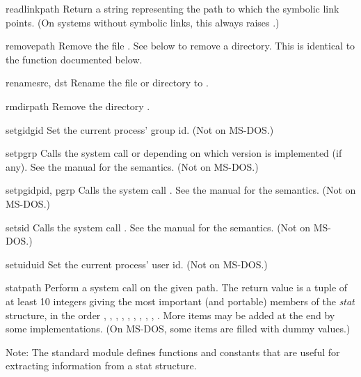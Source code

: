 \begin{funcdesc}{readlink}{path}
Return a string representing the path to which the symbolic link
points.  (On systems without symbolic links, this always raises
.)
\end{funcdesc}

\begin{funcdesc}{remove}{path}
Remove the file .  See  below to remove a
directory.  This is identical to the  function
documented below.
\end{funcdesc}

\begin{funcdesc}{rename}{src, dst}
Rename the file or directory  to .
\end{funcdesc}

\begin{funcdesc}{rmdir}{path}
Remove the directory .
\end{funcdesc}

\begin{funcdesc}{setgid}{gid}
Set the current process' group id.
(Not on MS-DOS.)
\end{funcdesc}

\begin{funcdesc}{setpgrp}{}
Calls the system call  or  depending on which version is implemented (if any).  See the
\UNIX{} manual for the semantics.
(Not on MS-DOS.)
\end{funcdesc}

\begin{funcdesc}{setpgid}{pid, pgrp}
Calls the system call .  See the \UNIX{} manual
for the semantics.
(Not on MS-DOS.)
\end{funcdesc}

\begin{funcdesc}{setsid}{}
Calls the system call .  See the \UNIX{} manual
for the semantics.
(Not on MS-DOS.)
\end{funcdesc}

\begin{funcdesc}{setuid}{uid}
Set the current process' user id.
(Not on MS-DOS.)
\end{funcdesc}

\begin{funcdesc}{stat}{path}
Perform a  system call on the given path.  The
return value is a tuple of at least 10 integers giving the most
important (and portable) members of the \emph{stat} structure, in the
order
,
,
,
,
,
,
,
,
,
.
More items may be added at the end by some implementations.
(On MS-DOS, some items are filled with dummy values.)

Note: The standard module  defines
functions and constants that are useful for extracting information
from a stat structure.
\end{funcdesc}

